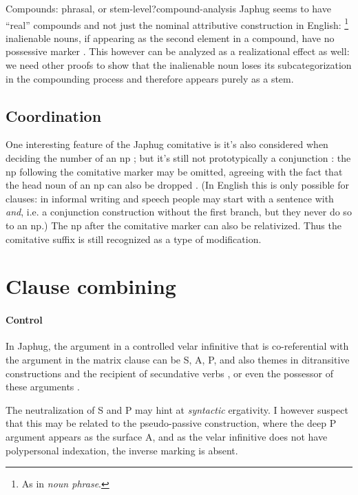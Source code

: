 \documentclass[a4paper, oneside, 12pt]{report}
\newcommand*{\citepage}[1]{p.~{#1}}
\newcommand{\form}[1]{\emph{#1}}
\begin{document}
\begin{todobox}{Compounds: phrasal, or stem-level?}{compound-analysis}
    Japhug seems to have ``real'' compounds and not just
    the nominal attributive construction in English:%
    \footnote{
        As in \form{noun phrase}.
    }
    inalienable nouns, if appearing as the second element in a compound,
    have no possessive marker \citep[\citepage{15}]{jacques2021grammar}. 
    This however can be analyzed as a realizational effect as well:
    we need other proofs to show that the inalienable noun 
    loses its subcategorization in the compounding process
    and therefore appears purely as a stem.
\end{todobox}

\subsection{Coordination}
One interesting feature of the Japhug comitative 
is it's also considered when deciding the number of an \acs{np}
\citep[\citepage{332}]{jacques2021grammar};
but it's still not prototypically a conjunction \citep[\citepage{420}]{jacques2021grammar}:
the \acs{np} following the comitative marker 
may be omitted, 
agreeing with the fact 
that the head noun of an \acs{np}
can also be dropped \citep[\citepage{425}]{jacques2021grammar}.
(In English this is only possible for clauses:
in informal writing and speech people may start with a sentence with \form{and},
i.e. a conjunction construction 
without the first branch,
but they never do so to an \acs{np}.)
The \acs{np} after the comitative marker can also be relativized.
Thus the comitative suffix is still recognized as a type of 
modification.

\section{Clause combining}

\paragraph*{Control} In Japhug, the argument in a controlled velar infinitive
that is co-referential with the argument in the matrix clause
can be S, A, P, and also themes in ditransitive constructions
and the recipient of secundative verbs \citep{jacques2016subjects},
or even the possessor of these arguments \citep[\citepage{1366}]{jacques2021grammar}.

The neutralization of S and P may hint at \emph{syntactic} ergativity.
I however suspect that this may be related to the pseudo-passive construction,
where the deep P argument appears as the surface A,
and as the velar infinitive does not have polypersonal indexation,
the inverse marking is absent.
\end{document}
